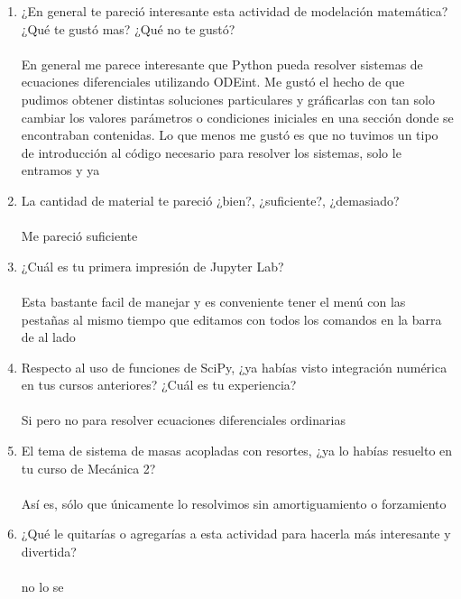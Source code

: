 \documentclass{article}
\begin{document}
\begin{enumerate}
\item ¿En general te pareció interesante esta actividad de modelación matemática? ¿Qué te gustó mas? ¿Qué no te gustó? ~\\~\\
En general me parece interesante que Python pueda resolver sistemas de ecuaciones diferenciales utilizando ODEint.
Me gustó el hecho de que pudimos obtener distintas soluciones particulares y gráficarlas con tan solo cambiar los valores parámetros o condiciones iniciales en una sección donde se encontraban contenidas.
Lo que menos me gustó es que no tuvimos un tipo de introducción al código necesario para resolver los sistemas, solo le entramos y ya

\item La cantidad de material te pareció ¿bien?, ¿suficiente?, ¿demasiado?~\\~\\
Me pareció suficiente

\item ¿Cuál es tu primera impresión de Jupyter Lab? ~\\~\\
Esta bastante facil de manejar y es conveniente tener el menú con las pestañas al mismo tiempo que editamos con todos los comandos en la barra de al lado

\item Respecto al uso de funciones de SciPy, ¿ya habías visto integración numérica en tus cursos anteriores? ¿Cuál es tu experiencia?  ~\\~\\
Si pero no para resolver ecuaciones diferenciales ordinarias

\item El tema de sistema de masas acopladas con resortes, ¿ya lo habías resuelto en tu curso de Mecánica 2?  ~\\~\\
Así es, sólo que únicamente lo resolvimos sin amortiguamiento o forzamiento

\item ¿Qué le quitarías o agregarías a esta actividad para hacerla más interesante y divertida? ~\\~\\
no lo se 


\end{enumerate}
\end{document}
